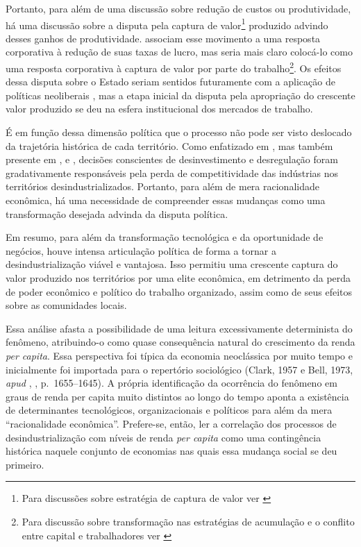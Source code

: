 Portanto, para além de uma discussão sobre redução de custos ou
produtividade, há uma discussão sobre a disputa pela captura de
valor\footnote{Para discussões sobre estratégia de captura de valor ver
  \citet{henderson_redes_2011}} produzido
advindo desses ganhos de produtividade. \citet{bluestone_deindustrialization_1982} associam esse
movimento a uma resposta corporativa à redução de suas taxas de lucro,
mas seria mais claro colocá-lo como uma resposta corporativa à captura
de valor por parte do trabalho\footnote{Para discussão sobre
  transformação nas estratégias de acumulação e o conflito entre capital
  e trabalhadores ver \citet{harvey_condition_1992}}. Os efeitos
dessa disputa sobre o Estado seriam sentidos futuramente com a aplicação
de políticas neoliberais
\citep{lawson_making_2020,scheiring_deindustrialization_2023}, mas a etapa inicial da disputa pela
apropriação do crescente valor produzido se deu na esfera institucional
dos mercados de trabalho.

É em função dessa dimensão política que o processo não pode ser visto
deslocado da trajetória histórica de cada território. Como enfatizado em
\citet{bluestone_deindustrialization_1982}, mas também
presente em \citet{nettleingham_beyond_2019}, \citet{hodson_titanic_2019} e \citet{clarke_closing_2015}, decisões
conscientes de desinvestimento e desregulação foram gradativamente
responsáveis pela perda de competitividade das indústrias nos
territórios desindustrializados. Portanto, para além de mera
racionalidade econômica, há uma necessidade de compreender essas
mudanças como uma transformação desejada advinda da disputa política.

Em resumo, para além da transformação tecnológica e da oportunidade de
negócios, houve intensa articulação política de forma a tornar a
desindustrialização viável e vantajosa. Isso permitiu uma crescente
captura do valor produzido nos territórios por uma elite econômica, em
detrimento da perda de poder econômico e político do trabalho
organizado, assim como de seus efeitos sobre as comunidades locais.

Essa análise afasta a possibilidade de uma leitura excessivamente
determinista do fenômeno, atribuindo-o como quase consequência natural
do crescimento da renda \emph{per capita}. Essa perspectiva foi típica
da economia neoclássica por muito tempo e inicialmente foi importada
para o repertório sociológico
(Clark, 1957 e Bell, 1973, \emph{apud} \citeauthor{kollmeyer_explaining_2009}, \citeyear{kollmeyer_explaining_2009}, p.~1655--1645). A própria identificação
da ocorrência do fenômeno em graus de renda per capita muito distintos
ao longo do tempo
\citep{rodrik_premature_2016}
aponta a existência de determinantes tecnológicos, organizacionais e
políticos para além da mera ``racionalidade econômica''. Prefere-se,
então, ler a correlação dos processos de desindustrialização com níveis
de renda \emph{per capita} como uma contingência histórica naquele
conjunto de economias nas quais essa mudança social se deu primeiro.


